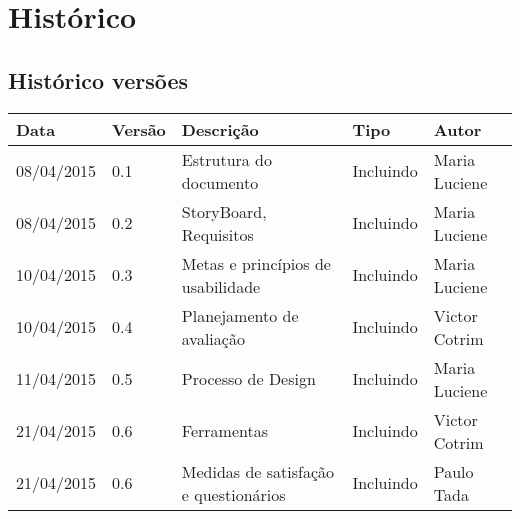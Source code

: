 \chapter[Histórico]{Histórico}

\section{Histórico versões}

\begin{table}[h]
	\centering
	\begin{tabular}{|l|l|l|l|l|}
		\hline
		Data & Versão & Descrição & Tipo & Autor \\ \hline
		08/04/2015 & 0.1 & Estrutura do documento & Incluindo & Maria Luciene \\ \hline
		08/04/2015 & 0.2 & StoryBoard, Requisitos & Incluindo & Maria Luciene \\ \hline
		10/04/2015 & 0.3 & Metas e princípios de usabilidade & Incluindo & Maria Luciene \\ \hline
		10/04/2015 & 0.4 & Planejamento de avaliação & Incluindo & Victor Cotrim \\ \hline
		11/04/2015 & 0.5 & Processo de Design & Incluindo & Maria Luciene \\ \hline	
		21/04/2015 & 0.6 & Ferramentas & Incluindo & Victor Cotrim \\ \hline
		21/04/2015 & 0.6 & Medidas de satisfação e questionários & Incluindo & Paulo Tada \\ \hline
	\end{tabular}
\end{table}
